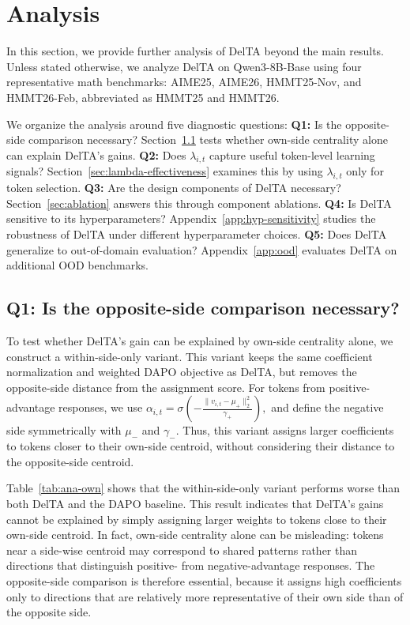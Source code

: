 \documentclass{article} %
\begin{document}
\section{Analysis}
In this section, we provide further analysis of DelTA beyond the main results.
Unless stated otherwise, we analyze DelTA on Qwen3-8B-Base using four representative math benchmarks: AIME25, AIME26, HMMT25-Nov, and HMMT26-Feb, abbreviated as HMMT25 and HMMT26.

We organize the analysis around five diagnostic questions:
\textbf{Q1:} Is the opposite-side comparison necessary?
Section~\ref{sec:own-side-main} tests whether own-side centrality alone can explain DelTA's gains.
\textbf{Q2:} Does $\lambda_{i,t}$ capture useful
token-level learning signals?
Section~\ref{sec:lambda-effectiveness} examines this by using $\lambda_{i,t}$
only for token selection.
\textbf{Q3:} Are the design components of DelTA necessary?
Section~\ref{sec:ablation} answers this through component ablations.
\textbf{Q4:} Is DelTA sensitive to its hyperparameters?
Appendix~\ref{app:hyp-sensitivity} studies the robustness of DelTA
under different hyperparameter choices.
\textbf{Q5:} Does DelTA generalize to out-of-domain evaluation?
Appendix~\ref{app:ood} evaluates DelTA on additional OOD benchmarks.


\subsection{Q1: Is the opposite-side comparison necessary?}
\label{sec:own-side-main}

To test whether DelTA's gain can be explained by own-side centrality alone, we construct a within-side-only variant.
This variant keeps the same coefficient normalization and weighted DAPO objective as DelTA, but removes the opposite-side distance from the assignment score. For tokens from positive-advantage responses, we use
$
\alpha_{i,t}
=
\sigma\!\left(
-\frac{\|v_{i,t}-\mu_+\|_2^2}{\gamma_+}
\right),
$
and define the negative side symmetrically with \(\mu_-\) and \(\gamma_-\).
Thus, this variant assigns larger coefficients to tokens closer to their own-side centroid, without considering their distance to the opposite-side centroid.

Table~\ref{tab:ana-own} shows that the within-side-only variant performs worse than both DelTA and the DAPO baseline. This result indicates that DelTA's gains cannot be explained by simply assigning larger weights to tokens close to their own-side centroid. In fact, own-side centrality alone can be misleading: tokens near a side-wise centroid may correspond to shared patterns rather than directions that distinguish positive- from negative-advantage responses. The opposite-side comparison is therefore essential, because it assigns high coefficients only to directions that are relatively more representative of their own side than of the opposite side.
\end{document}
